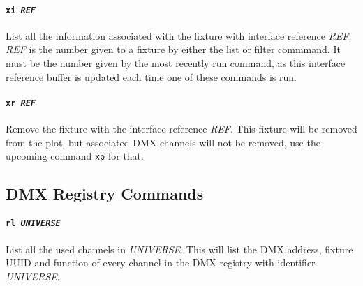 \documentclass[a4paper]{article}
\begin{document}
\paragraph{\texttt{xi \textit{REF}}}
List all the information associated with the fixture with interface reference 
\textit{REF}. \textit{REF} is the number given to a fixture by either the 
list or filter commmand. It must be the number given by the most recently run 
command, as this interface reference buffer is updated each time one of these 
commands is run.

\paragraph{\texttt{xr \textit{REF}}}
Remove the fixture with the interface reference \textit{REF}. This fixture 
will be removed from the plot, but associated DMX channels will not be 
removed, use the upcoming command \texttt{xp} for that.

\subsection{DMX Registry Commands}

\paragraph{\texttt{rl \textit{UNIVERSE}}}
List all the used channels in \textit{UNIVERSE}. This will list the DMX 
address, fixture UUID and function of every channel in the DMX registry with 
identifier \textit{UNIVERSE}.
\end{document}
